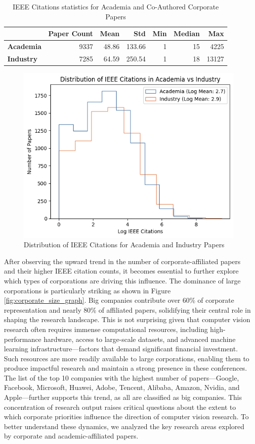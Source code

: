 \documentclass{article}
\begin{document}
\begin{table}[h]
    \centering
    \begin{tabular}{|l|r|r|r|r|r|r|}
        \hline
        & \textbf{Paper Count} & \textbf{Mean} & \textbf{Std} & \textbf{Min} & \textbf{Median} & \textbf{Max} \\
        \hline
        \textbf{Academia} & 9337 & 48.86 & 133.66 & 1 & 15 & 4225 \\
        \hline
        \textbf{Industry} & 7285 & 64.59 & 250.54 & 1 & 18 & 13127 \\
        \hline
    \end{tabular}
    \caption{IEEE Citations statistics for Academia and Co-Authored Corporate Papers}
    \label{tab:ieee_citations}
\end{table}

\begin{figure}
    \centering
    \includegraphics[width=0.6\linewidth]{report/images/histogram_ieee_citations.png}
    \caption{Distribution of IEEE Citations for Academia and Industry Papers}
    \label{fig:ieee_citations}
\end{figure}

After observing the upward trend in the number of corporate-affiliated papers and their higher IEEE citation counts, it becomes essential to further explore which types of corporations are driving this influence. The dominance of large corporations is particularly striking as shown in Figure \ref{fig:corporate_size_graph}. Big companies contribute over 60\% of corporate representation and nearly 80\% of affiliated papers, solidifying their central role in shaping the research landscape. This is not surprising given that computer vision research often requires immense computational resources, including high-performance hardware, access to large-scale datasets, and advanced machine learning infrastructure—factors that demand significant financial investment. Such resources are more readily available to large corporations, enabling them to produce impactful research and maintain a strong presence in these conferences. The list of the top 10 companies with the highest number of papers—Google, Facebook, Microsoft, Huawei, Adobe, Tencent, Alibaba, Amazon, Nvidia, and Apple—further supports this trend, as all are classified as big companies. This concentration of research output raises critical questions about the extent to which corporate priorities influence the direction of computer vision research. To better understand these dynamics, we analyzed the key research areas explored by corporate and academic-affiliated papers. 
\end{document}
